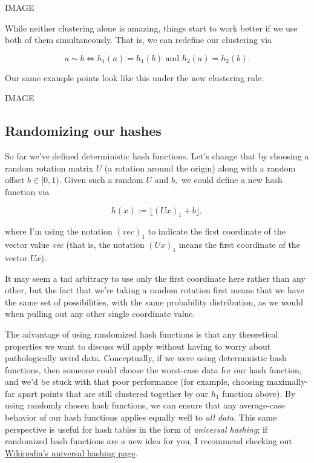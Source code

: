 \documentclass[20pt,]{extarticle}
\begin{document}
IMAGE

While neither clustering alone is amazing, things start to work better
if we use both of them simultaneously. That is, we can redefine our
clustering via

\begin{equation} a \sim b \iff h_1(a) = h_1(b) \text{ and } h_2(a) = h_2(b). \label{eq:eq1}\end{equation}

Our same example points look like this under the new clustering rule:

IMAGE

\subsection{Randomizing our hashes}\label{randomizing-our-hashes}

So far we've defined deterministic hash functions. Let's change that by
choosing a random rotation matrix \(U\) (a rotation around the origin)
along with a random offset \(b \in [0, 1).\) Given such a random \(U\)
and \(b,\) we could define a new hash function via

\[ h(x) := \lfloor (Ux)_1 + b \rfloor, \]

where I'm using the notation \(( \textit{vec} )_1\) to indicate the
first coordinate of the vector value \emph{vec} (that is, the notation
\((Ux)_1\) means the first coordinate of the vector \(Ux\)).

It may seem a tad arbitrary to use only the first coordinate here rather
than any other, but the fact that we're taking a random rotation first
means that we have the same set of possibilities, with the same
probability distribution, as we would when pulling out any other single
coordinate value.

The advantage of using randomized hash functions is that any theoretical
properties we want to discuss will apply without having to worry about
pathologically weird data. Conceptually, if we were using deterministic
hash functions, then someone could choose the worst-case data for our
hash function, and we'd be stuck with that poor performance (for
example, choosing maximally-far apart points that are still clustered
together by our \(h_1\) function above). By using randomly chosen hash
functions, we can ensure that any average-case behavior of our hash
functions applies equally well to \emph{all data}. This same perspective
is useful for hash tables in the form of \emph{universal hashing}; if
randomized hash functions are a new idea for you, I recommend checking
out \href{https://en.wikipedia.org/wiki/Universal_hashing}{Wikipedia's
universal hashing page}.
\end{document}
